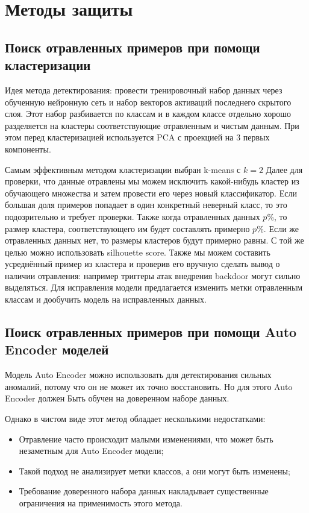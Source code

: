 \section{Методы защиты}
\subsection*{Поиск отравленных примеров при помощи кластеризации}
Идея метода детектирования: провести тренировочный набор данных через
обученную нейронную сеть и набор векторов активаций последнего скрытого
слоя. Этот набор разбивается по классам и в каждом классе отдельно хорошо
разделяется на кластеры соответствующие отравленным и чистым данным.
При этом перед кластеризацией используется PCA с проекцией на 3 первых
компоненты.

Самым эффективным методом кластеризации выбран k-means с $k=2$ Далее для проверки, что данные отравлены мы можем исключить какой-нибудь
кластер из обучающего множества и затем провести его через новый классификатор. Если большая доля примеров попадает в один конкретный неверный
класс, то это подозрительно и требует проверки.
Также когда отравленных данных $p\%$, то размер кластера, соответствующего им будет составлять примерно $p\%$. Если же отравленных данных нет,
то размеры кластеров будут примерно равны. С той же целью можно использовать silhouette score.
Также мы можем составить усреднённый пример из кластера и проверив его вручную сделать вывод о наличии отравления: например триггеры атак внедрения backdoor могут сильно выделяться.
Для исправления модели предлагается изменить метки отравленным
классам и дообучить модель на исправленных данных.

\subsection*{Поиск отравленных примеров при помощи Auto Encoder моделей}
Модель Auto Encoder можно использовать для детектирования сильных аномалий, потому что он не может их точно восстановить. Но для этого Auto Encoder должен Быть обучен на доверенном наборе данных.

Однако в чистом виде этот метод обладает несколькими недостатками:
\begin{itemize}
    \item Отравление часто происходит малыми изменениями, что может быть незаметным для Auto Encoder модели;
    \item Такой подход не анализирует метки классов, а они могут быть изменены;
    \item Требование доверенного набора данных накладывает существенные ограничения на применимость этого метода.
\end{itemize}

